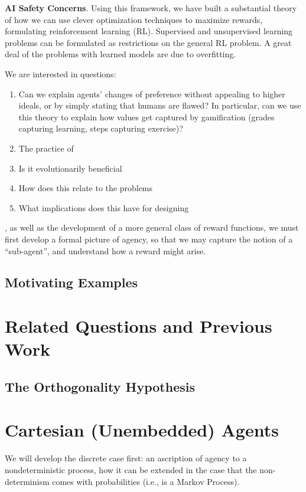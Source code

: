 \documentclass{article}
\theoremstyle{definition}
\begin{document}
	\textbf{AI Safety Concerns}. Using this framework, we have built a substantial theory of how we can use clever optimization techniques to maximize rewards, formulating reinforcement learning (RL). Supervised and unsupervised learning problems can be formulated as restrictions on the general RL problem. A great deal of the problems with learned models are due to overfitting.
	
	
	We are interested in questions:
	\begin{enumerate}
		\item Can we explain agents' changes of preference without appealing to higher ideals, or by simply stating that humans are flawed? In particular, can we use this theory to explain how values get captured by gamification (grades capturing learning, steps capturing exercise)? 
		\item The practice of 
		\item Is it evolutionarily beneficial 
		\item How does this relate to the problems 
		\item What implications does this have for designing
	\end{enumerate}
	
	
	
	, as well as the development of a more general class of reward functions, we must first develop a formal picture of agency, so that we may capture the notion of a ``sub-agent'', and understand how a reward might arise.
	
	\subsection{Motivating Examples}
	
	\section{Related Questions and Previous Work}
	\subsection{The Orthogonality Hypothesis}
	
	
	\section{Cartesian (Unembedded) Agents}
	We will develop the discrete case first: an ascription of agency to a nondeterministic process, how it can be extended in the case that the non-determinism comes with probabilities (i.e., is a Markov Process).
	
\end{document}
